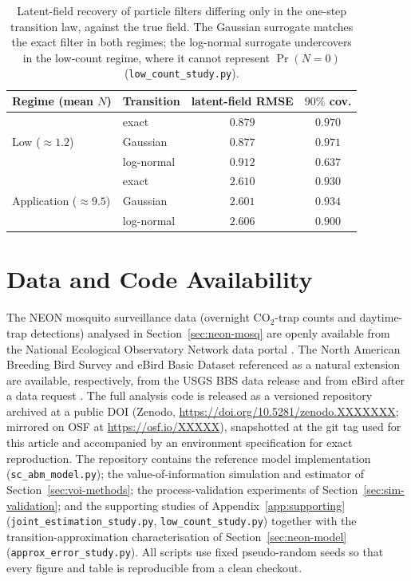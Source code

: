 \documentclass[preprint,12pt]{elsarticle}
\theoremstyle{definition}
\begin{document}
\begin{table}[t]
\centering\small\renewcommand{\arraystretch}{1.2}
\begin{tabular}{llcc}
\toprule
Regime (mean $N$) & Transition & latent-field RMSE & $90\%$ cov. \\
\midrule
\multirow{3}{*}{Low ($\approx1.2$)}
 & exact       & $0.879$ & $0.970$ \\
 & Gaussian    & $0.877$ & $0.971$ \\
 & log-normal  & $0.912$ & $0.637$ \\
\midrule
\multirow{3}{*}{Application ($\approx9.5$)}
 & exact       & $2.610$ & $0.930$ \\
 & Gaussian    & $2.601$ & $0.934$ \\
 & log-normal  & $2.606$ & $0.900$ \\
\bottomrule
\end{tabular}
\caption{Latent-field recovery of particle filters differing only in the
one-step transition law, against the true field. The Gaussian surrogate matches
the exact filter in both regimes; the log-normal surrogate undercovers in the
low-count regime, where it cannot represent $\Pr(N=0)$
(\texttt{low\_count\_study.py}).}
\label{tab:app-lowcount}
\end{table}

\section*{Data and Code Availability}

The NEON mosquito surveillance data (overnight $\mathrm{CO}_2$-trap counts and
daytime-trap detections) analysed in Section~\ref{sec:neon-mosq} are openly
available from the National Ecological Observatory Network data portal
\citep{neon2024}. The North American Breeding Bird Survey and eBird Basic Dataset
referenced as a natural extension are available, respectively, from the USGS BBS
data release \citep{usgsbbs2022} and from eBird after a data request
\citep{ebirddata2026}. The full analysis code is released as a versioned repository archived at a
public DOI (Zenodo, \url{https://doi.org/10.5281/zenodo.XXXXXXX}; mirrored on OSF at
\url{https://osf.io/XXXXX}), snapshotted at the git tag used for this article and
accompanied by an environment specification for exact reproduction. The
repository contains the reference model implementation
(\texttt{sc\_abm\_model.py}); the value-of-information simulation and estimator
of Section~\ref{sec:voi-methods}; the process-validation experiments of
Section~\ref{sec:sim-validation}; and the supporting studies of
Appendix~\ref{app:supporting} (\texttt{joint\_estimation\_study.py},
\texttt{low\_count\_study.py}) together with the transition-approximation
characterisation of Section~\ref{sec:neon-model}
(\texttt{approx\_error\_study.py}). All scripts use fixed pseudo-random seeds so
that every figure and table is reproducible from a clean checkout.
\end{document}
